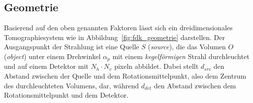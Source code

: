 \subsection{Geometrie}\label{sssec:fdk_geometrie}

Basierend auf den oben genannten Faktoren lässt sich ein dreidimensionales Tomographiesystem wie in
Abbildung~\ref{fig:fdk_geometrie} darstellen. Der Ausgangspunkt der Strahlung ist eine Quelle $S$ (\textit{source}), die
das Volumen $O$ (\textit{object}) unter einem Drehwinkel $\alpha_p$ mit einem \textit{kegelförmigen} Strahl
durchleuchtet und auf einem Detektor mit $N_h \cdot N_v$ \gls{pixel}n abbildet. Dabei stellt $d_{src}$ den Abstand
zwischen der Quelle und dem Rotationsmittelpunkt, also dem Zentrum des durchleuchteten Volumens, dar, während $d_{det}$
den Abstand zwischen dem Rotationsmittelpunkt und dem Detektor.

